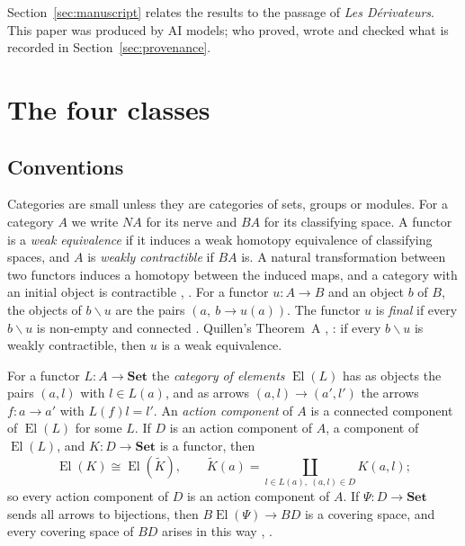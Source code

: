 \documentclass[11pt,a4paper]{article}
\theoremstyle{definition}
\newcommand{\El}{\operatorname{El}}
\newcommand{\Set}{\mathbf{Set}}
\begin{document}
Section~\ref{sec:manuscript} relates the results to the passage of
\emph{Les D\'erivateurs}. This paper was produced by AI models; who proved,
wrote and checked what is recorded in Section~\ref{sec:provenance}.
\section{The four classes}\label{sec:classes}

\subsection{Conventions}

Categories are small unless they are categories of sets, groups or modules.
For a category $A$ we write $NA$ for its nerve and $BA$ for its classifying
space. A functor is a \emph{weak equivalence} if it induces a weak homotopy
equivalence of classifying spaces, and $A$ is \emph{weakly contractible} if
$BA$ is. A natural transformation between two functors induces a homotopy
between the induced maps, and a category with an initial object is
contractible \cite{Quillen}, \cite[IV.3.2 and Example~IV.3.2.2]{Kbook}. For a
functor $u\colon A\to B$ and an object $b$ of $B$, the objects of
$b\backslash u$ are the pairs $(a,\ b\to u(a))$. The functor $u$ is
\emph{final} if every $b\backslash u$ is non-empty and connected
\cite[IX.3]{CWM}. Quillen's Theorem~A \cite{Quillen}, \cite[IV.3.7]{Kbook}: if every
$b\backslash u$ is weakly contractible, then $u$ is a weak equivalence.

For a functor $L\colon A\to\Set$ the \emph{category of elements} $\El(L)$ has
as objects the pairs $(a,l)$ with $l\in L(a)$, and as arrows
$(a,l)\to(a',l')$ the arrows $f\colon a\to a'$ with $L(f)l=l'$. An
\emph{action component} of $A$ is a connected component of $\El(L)$ for some
$L$. If $D$ is an action component of $A$, a component of $\El(L)$, and
$K\colon D\to\Set$ is a functor, then
\begin{equation}\label{eq:composite}
 \El(K)\cong\El(\widetilde K),\qquad
 \widetilde K(a)=\coprod_{l\in L(a),\ (a,l)\in D}K(a,l) ;
\end{equation}
so every action component of $D$ is an action component of $A$. If
$\Psi\colon D\to\Set$ sends all arrows to bijections, then
$B\El(\Psi)\to BD$ is a covering space, and every covering space of $BD$
arises in this way \cite{Quillen}, \cite[IV.3.5.1 and Exercise~IV.3.1]{Kbook}.
\end{document}

